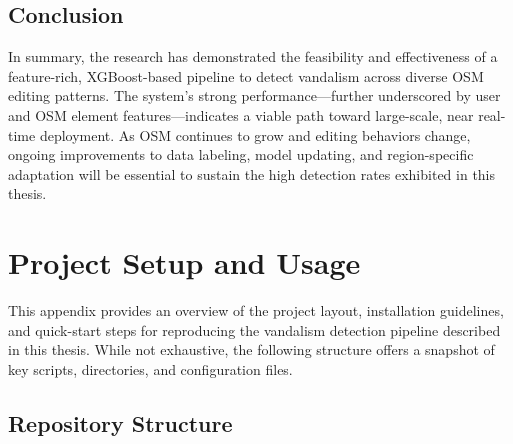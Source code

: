 \documentclass[
    13pt, %
    a4paper, %
    listof=totoc, %
    bibliography=totoc, %
    index=totoc, %
    headsepline
]{scrreprt}
\begin{document}
\section{Conclusion}
In summary, the research has demonstrated the feasibility and effectiveness of a feature-rich, XGBoost-based pipeline to detect vandalism across diverse OSM editing patterns. The system's strong performance—further underscored by user and OSM element features—indicates a viable path toward large-scale, near real-time deployment. As OSM continues to grow and editing behaviors change, ongoing improvements to data labeling, model updating, and region-specific adaptation will be essential to sustain the high detection rates exhibited in this thesis.

\appendix
\chapter{Project Setup and Usage}
\label{app:project_setup}

This appendix provides an overview of the project layout, installation guidelines, and quick-start steps for reproducing the vandalism detection pipeline described in this thesis. While not exhaustive, the following structure offers a snapshot of key scripts, directories, and configuration files.

\section{Repository Structure}
\end{document}
